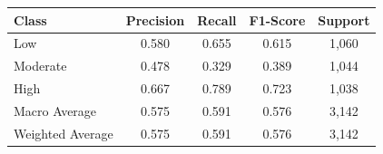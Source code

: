 \begin{tabular}{@{}lcccc@{}}
\toprule
Class & Precision & Recall & F1-Score & Support \\
\midrule
Low & 0.580 & 0.655 & 0.615 & 1,060 \\
Moderate & 0.478 & 0.329 & 0.389 & 1,044 \\
High & 0.667 & 0.789 & 0.723 & 1,038 \\
\midrule
Macro Average & 0.575 & 0.591 & 0.576 & 3,142 \\
Weighted Average & 0.575 & 0.591 & 0.576 & 3,142 \\
\bottomrule
\end{tabular}